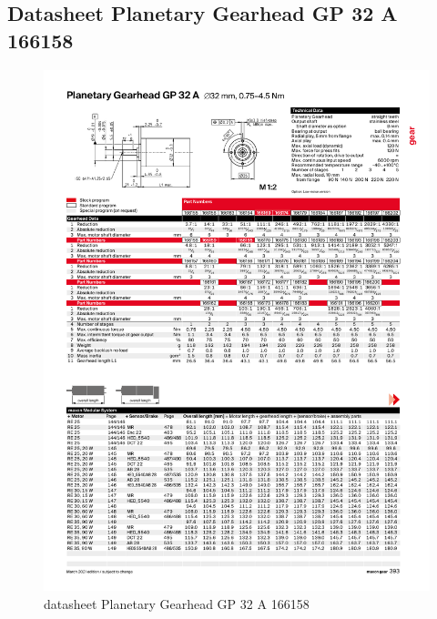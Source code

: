 \documentclass{article}
\begin{document}
\begin{appendices}
\section{Datasheet Planetary Gearhead GP 32 A 166158}
\begin{figure}[htbp]
  \centering %
  \includegraphics[page=1, clip, trim=0cm 0cm 0cm 0cm, scale = 0.65]{datasheet Planetary Gearhead GP 32 A 166158.pdf}
  \caption{datasheet Planetary Gearhead GP 32 A 166158}
  \label{fig:datasheet Planetary Gearhead GP 32 A 166158}
\end{figure}

\end{appendices}
\end{document}
